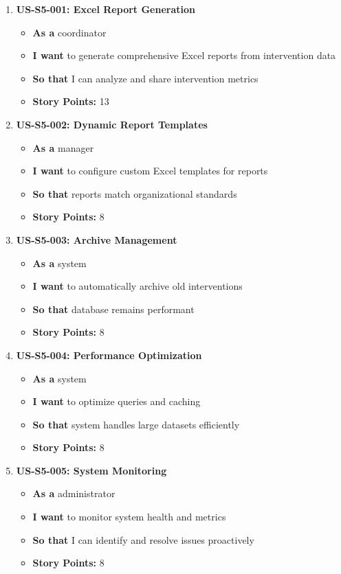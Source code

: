 \begin{enumerate}
\item \textbf{US-S5-001: Excel Report Generation}
  \begin{itemize}
  \item \textbf{As a} coordinator
  \item \textbf{I want} to generate comprehensive Excel reports from intervention data
  \item \textbf{So that} I can analyze and share intervention metrics
  \item \textbf{Story Points:} 13
  \end{itemize}

\item \textbf{US-S5-002: Dynamic Report Templates}
  \begin{itemize}
  \item \textbf{As a} manager
  \item \textbf{I want} to configure custom Excel templates for reports
  \item \textbf{So that} reports match organizational standards
  \item \textbf{Story Points:} 8
  \end{itemize}

\item \textbf{US-S5-003: Archive Management}
  \begin{itemize}
  \item \textbf{As a} system
  \item \textbf{I want} to automatically archive old interventions
  \item \textbf{So that} database remains performant
  \item \textbf{Story Points:} 8
  \end{itemize}

\item \textbf{US-S5-004: Performance Optimization}
  \begin{itemize}
  \item \textbf{As a} system
  \item \textbf{I want} to optimize queries and caching
  \item \textbf{So that} system handles large datasets efficiently
  \item \textbf{Story Points:} 8
  \end{itemize}

\item \textbf{US-S5-005: System Monitoring}
  \begin{itemize}
  \item \textbf{As a} administrator
  \item \textbf{I want} to monitor system health and metrics
  \item \textbf{So that} I can identify and resolve issues proactively
  \item \textbf{Story Points:} 8
  \end{itemize}
\end{enumerate}

